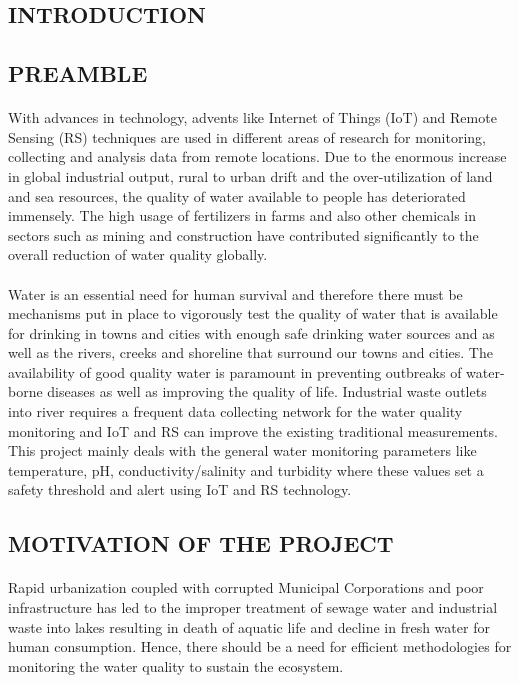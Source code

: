 
\newpage
\begin{center}
\section{INTRODUCTION}
\end{center}
\subsection{PREAMBLE}
\paragraph{}
With advances in technology, advents like Internet of Things (IoT) and Remote Sensing (RS) techniques are used in different areas of research for monitoring, collecting and analysis data from remote locations. Due to the enormous increase in global industrial output, rural to urban drift and the over-utilization of land and sea resources, the quality of water available to people has deteriorated immensely. The high usage of fertilizers in farms and also other chemicals in sectors such as mining and construction have contributed significantly to the overall reduction of water quality globally. 
\paragraph{}
Water is an essential need for human survival and therefore there must be mechanisms put in place to vigorously test the quality of water that is available for drinking in towns and cities with enough safe drinking water sources and as well as the rivers, creeks and shoreline that surround our towns and cities. The availability of good quality water is paramount in preventing outbreaks of water-borne diseases as well as improving the quality of life. Industrial waste outlets into river requires a frequent data collecting network for the water quality monitoring and IoT and RS can improve the existing traditional measurements. This project mainly deals with the general water monitoring parameters like temperature, pH, conductivity/salinity and turbidity where these values set a safety threshold and alert using IoT and RS technology.

\subsection{MOTIVATION OF THE PROJECT}
\paragraph{}
Rapid urbanization coupled with corrupted Municipal Corporations and poor infrastructure has led to the improper treatment of sewage water and industrial waste into lakes resulting in death of aquatic life and decline in fresh water for human consumption. Hence, there should be a need for efficient methodologies for monitoring the water quality to sustain the ecosystem.

